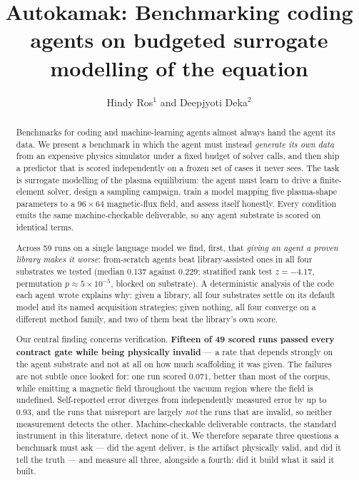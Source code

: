 \documentclass[12pt]{iopart}
\begin{document}
\title[Benchmarking coding agents on \GS{} surrogates]
      {Autokamak: Benchmarking coding agents on budgeted
       surrogate modelling of the \GS{} equation}

\author{Hindy Ros$^{1}$ and Deepjyoti Deka$^{2}$}
\address{$^{1}$ Massachusetts Institute of Technology, Cambridge, MA, USA}
\address{$^{2}$ MIT Energy Initiative, Massachusetts Institute of Technology,
         Cambridge, MA, USA}

\begin{abstract}
Benchmarks for coding and machine-learning agents almost always hand the agent
its data. We present a benchmark in which the agent must instead \emph{generate
its own data} from an expensive physics simulator under a fixed budget of
solver calls, and then ship a predictor that is scored independently on a
frozen set of cases it never sees. The task is surrogate modelling of the
\GS{} plasma equilibrium: the agent must learn to drive a finite-element
solver, design a sampling campaign, train a model mapping five plasma-shape
parameters to a $96\times64$ magnetic-flux field, and assess itself honestly.
Every condition emits the same machine-checkable deliverable, so any agent
substrate is scored on identical terms.

Across 59 runs on a single language model we find, first, that
\emph{giving an agent a proven library makes it worse}: from-scratch agents beat
library-assisted ones in all four substrates we tested (median \relltwo{}
$0.137$ against $0.229$; stratified rank test $z=-4.17$, permutation
$p\approx5\times10^{-5}$, blocked on substrate). A deterministic analysis of the
code each agent wrote explains why: given a library, all four substrates settle
on its default model and its named acquisition strategies; given nothing, all
four converge on a different method family, and two of them beat the library's
own score.

Our central finding concerns verification. \textbf{Fifteen of 49 scored runs
passed every contract gate while being physically invalid} --- a rate that
depends strongly on the agent substrate and not at all on how much scaffolding
it was given. The failures are not subtle once looked for: one run scored
$0.071$, better than most of the corpus, while emitting a magnetic field
throughout the vacuum region where the field is undefined. Self-reported error
diverges from independently measured error by up to $0.93$, and the runs that
misreport are largely \emph{not} the runs that are invalid, so neither
measurement detects the other. Machine-checkable deliverable contracts, the
standard instrument in this literature, detect none of it. We therefore
separate three questions a benchmark must ask --- did the agent deliver, is the
artifact physically valid, and did it tell the truth --- and measure all three,
alongside a fourth: did it build what it said it built.
\end{abstract}
\end{document}
